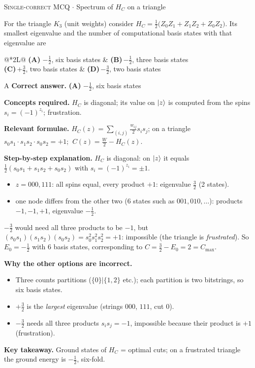 \documentclass[11pt,a4paper]{article}
\newcommand{\optlabel}[1]{\textbf{(#1)}}
\newcommand{\correctlabel}[1]{\textcolor{okgreen}{\textbf{(#1)}\,\ding{51}}}
\newenvironment{qitem}[1]{\begin{list}{}{\setlength{\leftmargin}{3.3em}\setlength{\labelwidth}{3.1em}%
  \setlength{\labelsep}{0.2em}\setlength{\topsep}{3pt}\setlength{\parsep}{3pt}}\item[\textbf{Q.#1}\hfill]}{\end{list}}
\newcommand{\qsep}{\par\vspace{2pt}{\color{black!15}\hrule}\vspace{4pt}}
\newcommand{\qmeta}[2]{{\footnotesize\color{black!60}\textsc{#1} \;$\cdot$\; #2}\par}
\begin{document}
\begin{qitem}{9}
\qmeta{Single-correct MCQ}{Spectrum of $H_C$ on a triangle}
For the triangle $K_3$ (unit weights) consider $H_C = \tfrac12\big(Z_0Z_1 + Z_1Z_2 + Z_0Z_2\big)$. Its smallest eigenvalue
and the number of computational basis states with that eigenvalue are
\par\smallskip\noindent\begin{tabularx}{\linewidth}{@{}*{2}{L}@{}}
\correctlabel{A}\,$-\tfrac12$, six basis states & \optlabel{B}\,$-\tfrac12$, three basis states \\[3pt]
\optlabel{C}\,$+\tfrac32$, two basis states & \optlabel{D}\,$-\tfrac32$, two basis states
\end{tabularx}
\end{qitem}
\begin{solbox}{A}
\textbf{\color{brand}Correct answer.} \textcolor{okgreen}{\textbf{(A)}} $-\tfrac12$, six basis states

\textbf{\color{brand}Concepts required.} $H_C$ is diagonal; its value on $\ket z$ is computed from the spins $s_i = (-1)^{z_i}$; frustration.

\textbf{\color{brand}Relevant formulae.} $H_C(z) = \sum_{(i,j)}\tfrac{w_{ij}}{2}s_is_j$; on a triangle $s_0s_1\cdot s_1s_2\cdot s_0s_2 = +1$; $\ C(z) = \tfrac W2 - H_C(z)$.

\textbf{\color{brand}Step-by-step explanation.} $H_C$ is diagonal: on $\ket{z}$ it equals $\tfrac12(s_0s_1 + s_1s_2 + s_0s_2)$ with $s_i = (-1)^{z_i} = \pm1$.
\begin{itemize}\itemsep0pt
\item $z = 000, 111$: all spins equal, every product $+1$: eigenvalue $\tfrac32$ (2 states).
\item one node differs from the other two (6 states such as $001, 010, \dots$): products $-1, -1, +1$, eigenvalue $-\tfrac12$.
\end{itemize}
$-\tfrac32$ would need all three products to be $-1$, but $(s_0s_1)(s_1s_2)(s_0s_2) = s_0^2 s_1^2 s_2^2 = +1$: impossible
(the triangle is \emph{frustrated}). So $E_0 = -\tfrac12$ with 6 basis states, corresponding to $C = \tfrac32 - E_0 = 2 = C_{\max}$.

\textbf{\color{brand}Why the other options are incorrect.}
\begin{itemize}[leftmargin=2.4em, itemsep=1pt, topsep=2pt]
\item[\textbf{(B)}] Three counts partitions ($\{0\}|\{1,2\}$ etc.); each partition is two bitstrings, so six basis states.
\item[\textbf{(C)}] $+\frac32$ is the \emph{largest} eigenvalue (strings $000$, $111$, cut $0$).
\item[\textbf{(D)}] $-\frac32$ needs all three products $s_is_j = -1$, impossible because their product is $+1$ (frustration).
\end{itemize}
\textbf{\color{brand}Key takeaway.} Ground states of $H_C$ = optimal cuts; on a frustrated triangle the ground energy is $-\frac12$, six-fold.
\end{solbox}
\qsep
\end{document}
